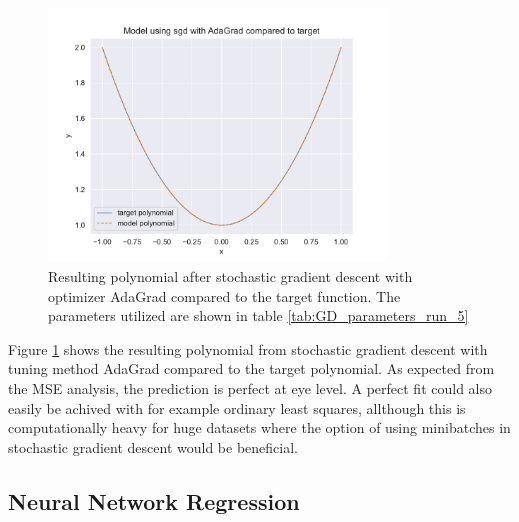 \begin{figure}[H]
\centering
\includegraphics[width=0.8\textwidth]{Figures/PartA/sgd_polynomial_fit}
\caption{Resulting polynomial after stochastic gradient descent with optimizer AdaGrad compared to the target function.
 The parameters utilized are shown in table \ref{tab:GD_parameters_run_5}}
\label{fig:sgd_polynomial_fit}
\end{figure}

Figure \ref{fig:sgd_polynomial_fit} shows the resulting polynomial from stochastic gradient descent with tuning method AdaGrad compared 
to the target polynomial. As expected from the MSE analysis, the prediction is perfect at eye level. A perfect fit could also easily be achived 
with for example ordinary least squares, allthough this is computationally heavy for huge datasets where the option of using minibatches in 
stochastic gradient descent would be beneficial. 

\subsection{Neural Network Regression}

